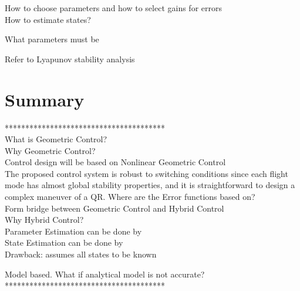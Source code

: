 How to choose parameters and how to select gains for errors\\

How to estimate states?



What parameters must be 

Refer to Lyapunov stability analysis \cite{Bullo2005}

\section{Summary}

***************************************\\
What is Geometric Control?\\
Why Geometric Control?\\
Control design will be based on Nonlinear Geometric Control\\

The proposed control system is robust to switching conditions since each flight mode has almost global stability properties, and it is straightforward to design a complex maneuver of a QR. \cite{Lee2010c}
Where are the Error functions based on?\\

Form bridge between Geometric Control and Hybrid Control\\
Why Hybrid Control?\\
Parameter Estimation can be done by\\

State Estimation can be done by\\

Drawback: assumes all states to be known

Model based. What if analytical model is not accurate?
***************************************\\